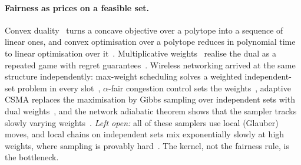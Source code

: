 \documentclass[11pt,a4paper]{article}
\begin{document}
\paragraph{Fairness as prices on a feasible set.}
Convex duality~\cite{fenchel1949conjugate,rockafellar1970convex,sion1958general} turns a
concave objective over a polytope into a sequence of linear ones, and convex optimisation over a polytope
reduces in polynomial time to linear optimisation over it~\cite{grotschel1988geometric}.
Multiplicative weights~\cite{freund1997decision,freund1999adaptive,arora2012multiplicative}
realise the dual as a repeated game with regret
guarantees~\cite{cesabianchi2006prediction}. Wireless networking arrived at the same structure
independently: max-weight scheduling solves a weighted independent-set problem in every
slot~\cite{tassiulas1992stability}, $\alpha$-fair congestion control sets the
weights~\cite{mo2000fair}, adaptive CSMA replaces the maximisation by Gibbs sampling over
independent sets with dual weights~\cite{jiang2010distributed}, and the network adiabatic
theorem shows that the sampler tracks slowly varying weights~\cite{rajagopalan2009network}.
\emph{Left open:} all of these samplers use local (Glauber) moves, and local chains on independent
sets mix exponentially slowly at high weights, where sampling is provably
hard~\cite{mossel2009hardness,sly2010computational}. The kernel, not the fairness rule, is the
bottleneck.
\end{document}
